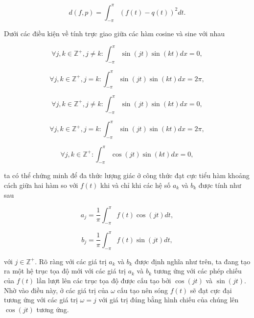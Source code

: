 			\begin{equation}
				d(f, p) = \int_{-\pi}^{\pi} (f(t) - q(t))^2 dt.
			\end{equation}
		
		Dưới các điều kiện về tính trực giao giữa các hàm cosine và sine với nhau
		
			\begin{equation}
				\forall j, k \in \mathbb{Z}^+, j \neq k: \int_{-\pi}^{\pi} \sin(jt) \sin(kt) dx = 0,
			\end{equation}
		
			\begin{equation}
				\forall j, k \in \mathbb{Z}^+, j = k: \int_{-\pi}^{\pi} \sin(jt) \sin(kt) dx = 2\pi,
			\end{equation}
		
			\begin{equation}
				\forall j, k \in \mathbb{Z}^+, j \neq k: \int_{-\pi}^{\pi} \sin(jt) \sin(kt) dx = 0,
			\end{equation}
		
			\begin{equation}
				\forall j, k \in \mathbb{Z}^+, j = k: \int_{-\pi}^{\pi} \sin(jt) \sin(kt) dx = 2\pi,
			\end{equation}
		
			\begin{equation}
				\forall j, k \in \mathbb{Z}^+: \int_{-\pi}^{\pi} \cos(jt) \sin(kt) dx = 0,
			\end{equation}
		
		\noindent ta có thể chứng minh \cite[\theorem{} 13.2]{approximate_trigonometric} để đa thức lượng giác ở công thức  đạt cực tiểu hàm khoảng cách giữa hai hàm  so với $f(t)$ khi và chỉ khi các hệ số $a_k$ và $b_k$ được tính như sau
		
			\begin{equation}
				a_j = \frac{1}{\pi} \int_{-\pi}^{\pi} f(t) \cos(j t) dt,
			\end{equation}
		
			\begin{equation}
				b_j = \frac{1}{\pi} \int_{-\pi}^{\pi} f(t) \sin(j t) dt,
			\end{equation}
		
		\noindent với $j \in \mathbb{Z}^+$. Rõ ràng với các giá trị $a_k$ và $b_k$ được định nghĩa như trên, ta đang tạo ra một hệ trục tọa độ mới với các giá trị $a_k$ và $b_k$ tương ứng với các phép chiếu của $f(t)$ lần lượt lên các trục tọa độ được cấu tạo bởi $\cos(j t)$ và $\sin(j t)$. Nhờ vào điều này, ở các giá trị của $\omega$ cấu tạo nên sóng $f(t)$ sẽ đạt cực đại tương ứng với các giá trị $\omega = j$ với giá trị đúng bằng hình chiếu của chúng lên $\cos(j t)$ tương ứng.
		
